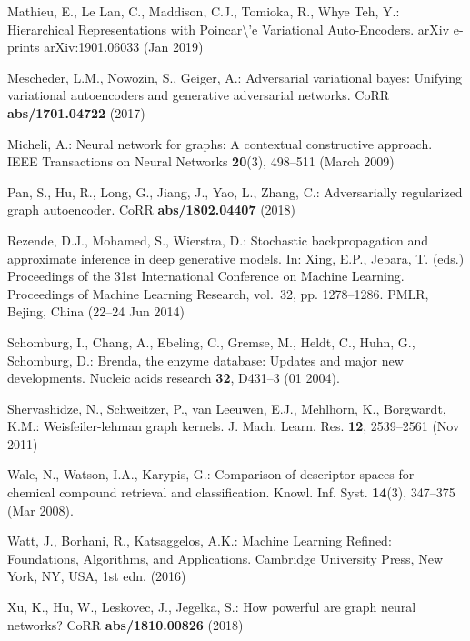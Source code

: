 \documentclass[runningheads]{llncs}
\begin{document}
\begin{thebibliography}{10}
{Mathieu}, E., {Le Lan}, C., {Maddison}, C.J., {Tomioka}, R., {Whye Teh}, Y.:
  {Hierarchical Representations with Poincar\textbackslash'e Variational
  Auto-Encoders}. arXiv e-prints arXiv:1901.06033 (Jan 2019)

Mescheder, L.M., Nowozin, S., Geiger, A.: Adversarial variational bayes:
  Unifying variational autoencoders and generative adversarial networks. CoRR
  \textbf{abs/1701.04722} (2017)

{Micheli}, A.: Neural network for graphs: A contextual constructive approach.
  IEEE Transactions on Neural Networks  \textbf{20}(3),  498--511 (March 2009)

Pan, S., Hu, R., Long, G., Jiang, J., Yao, L., Zhang, C.: Adversarially
  regularized graph autoencoder. CoRR  \textbf{abs/1802.04407} (2018)

Rezende, D.J., Mohamed, S., Wierstra, D.: Stochastic backpropagation and
  approximate inference in deep generative models. In: Xing, E.P., Jebara, T.
  (eds.) Proceedings of the 31st International Conference on Machine Learning.
  Proceedings of Machine Learning Research, vol.~32, pp. 1278--1286. PMLR,
  Bejing, China (22--24 Jun 2014)

Schomburg, I., Chang, A., Ebeling, C., Gremse, M., Heldt, C., Huhn, G.,
  Schomburg, D.: Brenda, the enzyme database: Updates and major new
  developments. Nucleic acids research  \textbf{32},  D431--3 (01 2004).

Shervashidze, N., Schweitzer, P., van Leeuwen, E.J., Mehlhorn, K., Borgwardt,
  K.M.: Weisfeiler-lehman graph kernels. J. Mach. Learn. Res.  \textbf{12},
  2539--2561 (Nov 2011)

Wale, N., Watson, I.A., Karypis, G.: Comparison of descriptor spaces for
  chemical compound retrieval and classification. Knowl. Inf. Syst.
  \textbf{14}(3),  347--375 (Mar 2008). 

Watt, J., Borhani, R., Katsaggelos, A.K.: Machine Learning Refined:
  Foundations, Algorithms, and Applications. Cambridge University Press, New
  York, NY, USA, 1st edn. (2016)

Xu, K., Hu, W., Leskovec, J., Jegelka, S.: How powerful are graph neural
  networks? CoRR  \textbf{abs/1810.00826} (2018)


\end{thebibliography}
\end{document}
